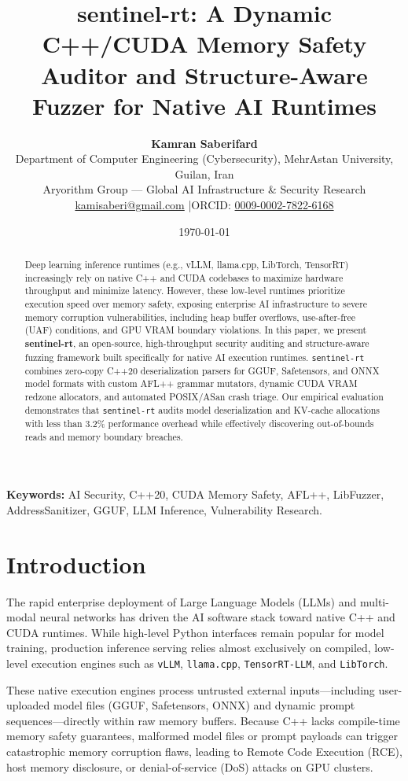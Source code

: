 \documentclass[10pt,twocolumn,a4paper]{article}
\title{\textbf{sentinel-rt: A Dynamic C++/CUDA Memory Safety Auditor and Structure-Aware Fuzzer for Native AI Runtimes}}
\author{
    \textbf{Kamran Saberifard}\\
    Department of Computer Engineering (Cybersecurity), MehrAstan University, Guilan, Iran\\
    Aryorithm Group — Global AI Infrastructure \& Security Research\\
    \href{mailto:kamisaberi@gmail.com}{kamisaberi@gmail.com} \quad|\quad ORCID: \href{https://orcid.org/0009-0002-7822-6168}{0009-0002-7822-6168}
}
\date{\today}
\begin{document}
\maketitle

\begin{abstract}
Deep learning inference runtimes (e.g., vLLM, llama.cpp, LibTorch, TensorRT) increasingly rely on native C++ and CUDA codebases to maximize hardware throughput and minimize latency. However, these low-level runtimes prioritize execution speed over memory safety, exposing enterprise AI infrastructure to severe memory corruption vulnerabilities, including heap buffer overflows, use-after-free (UAF) conditions, and GPU VRAM boundary violations. In this paper, we present \textbf{sentinel-rt}, an open-source, high-throughput security auditing and structure-aware fuzzing framework built specifically for native AI execution runtimes. \texttt{sentinel-rt} combines zero-copy C++20 deserialization parsers for GGUF, Safetensors, and ONNX model formats with custom AFL++ grammar mutators, dynamic CUDA VRAM redzone allocators, and automated POSIX/ASan crash triage. Our empirical evaluation demonstrates that \texttt{sentinel-rt} audits model deserialization and KV-cache allocations with less than 3.2\% performance overhead while effectively discovering out-of-bounds reads and memory boundary breaches.
\end{abstract}

\textbf{Keywords:} AI Security, C++20, CUDA Memory Safety, AFL++, LibFuzzer, AddressSanitizer, GGUF, LLM Inference, Vulnerability Research.

\section{Introduction}
The rapid enterprise deployment of Large Language Models (LLMs) and multi-modal neural networks has driven the AI software stack toward native C++ and CUDA runtimes. While high-level Python interfaces remain popular for model training, production inference serving relies almost exclusively on compiled, low-level execution engines such as \texttt{vLLM}, \texttt{llama.cpp}, \texttt{TensorRT-LLM}, and \texttt{LibTorch}.

These native execution engines process untrusted external inputs—including user-uploaded model files (GGUF, Safetensors, ONNX) and dynamic prompt sequences—directly within raw memory buffers. Because C++ lacks compile-time memory safety guarantees, malformed model files or prompt payloads can trigger catastrophic memory corruption flaws, leading to Remote Code Execution (RCE), host memory disclosure, or denial-of-service (DoS) attacks on GPU clusters.
\end{document}
